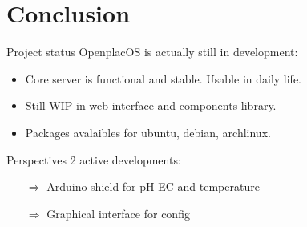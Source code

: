 \documentclass{beamer}
\begin{document}
\section{Conclusion}
\begin{frame}{Project status}
OpenplacOS is actually still in development:
 \begin{itemize}

\item Core server is functional and stable. Usable in daily life.
\item Still WIP in web interface and components library.
\item Packages avalaibles for ubuntu, debian, archlinux. 
\end{itemize}
\end{frame}
\begin{frame}{Perspectives}
2 active developments:
 \begin{itemize}
\item[$\Rightarrow$] Arduino shield for pH EC and temperature
\item[$\Rightarrow$] Graphical interface for config
\end{itemize}
\end{frame}
\end{document}
